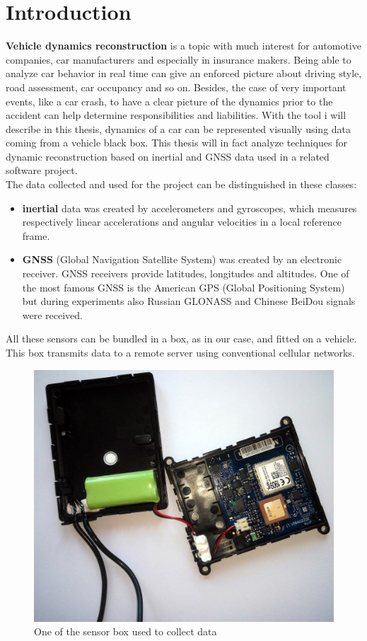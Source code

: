 \chapter{Introduction}
\label{chap:intro}

\textbf{Vehicle dynamics reconstruction} is a topic with much interest for automotive companies, car manufacturers and especially in insurance makers.
Being able to analyze car behavior in real time can give an enforced picture about driving style, road assessment, car occupancy and so on. Besides, the case of very important events, like a car crash, to have a clear picture of the dynamics prior to the accident can help determine responsibilities and liabilities.
With the tool i will describe in this thesis, dynamics of a car can be represented visually using data coming from a vehicle black box.
This thesis will in fact analyze techniques for dynamic reconstruction based on inertial and GNSS data used in a related software project. \\
The data collected and used for the project can be distinguished in these classes:
\begin{itemize}
\item \textbf{inertial} data was created by accelerometers and gyroscopes, which measures respectively linear accelerations and angular velocities in a local reference frame. 
\item \textbf{GNSS} (Global Navigation Satellite System) was created by an electronic receiver. GNSS receivers provide latitudes, longitudes and altitudes. One of the most famous GNSS is the American GPS (Global Positioning System) but during experiments also Russian GLONASS and Chinese BeiDou signals were received. 
\end{itemize}
All these sensors can be bundled in a box, as in our case, and fitted on a vehicle. This box transmits data to a remote server using conventional cellular networks. 

\begin{figure}[H]
\includegraphics[width=\linewidth]{box.jpg}
\caption{One of the sensor box used to collect data}
\end{figure}

